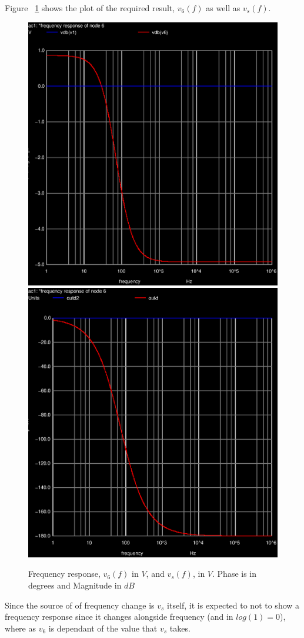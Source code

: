 Figure ~\ref{fig:simulation_5} shows the plot of the required result, $v_6(f)$ as well as $v_s(f)$.

\begin{figure}[!ht] \centering
\caption{Frequency response, $v_{6}(f)$ in $V$, and $v_s(f)$, in $V$. Phase is in degrees and Magnitude in $dB$}
\includegraphics[width=0.45\linewidth]{acm.eps}
\includegraphics[width=0.45\linewidth]{acm2.eps}
\label{fig:simulation_5}
\end{figure}

Since the source of of frequency change is $v_s$ itself, it is expected to not to show a frequency response since it changes alongside frequency (and in $log(1) = 0$), where as $v_6$ is dependant of the value that $v_s$ takes. 







